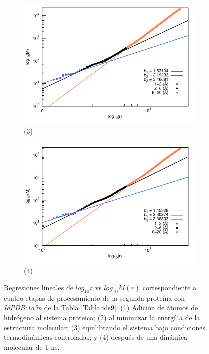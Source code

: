 \begin{figure}[H]
	\vspace{0cm} %
	
	\hspace{-0.3cm} 
	\begin{subfigure}{0.49\textwidth}
		\centering
		\includegraphics[width=\linewidth,page=1]{graphs/PDBs/1a3n/1a3nEq.pdf}
		\caption{(3)}
	\end{subfigure}
	\hspace{0.2cm}
	\begin{subfigure}{0.49\textwidth} %
		\centering
		\includegraphics[width=\linewidth,page=1]{graphs/PDBs/1a3n/1a3n1ns.pdf}
		\caption{(4)}
	\end{subfigure}
	\caption{Regresiones lineales de $log_{10}r$ vs $log_{10}M(r)$ correspondiente a cuatro etapas de procesamiento de la segunda prote\'{i}na con \textit{IdPDB:1a3n} de la Tabla \ref{Tabla:ids9}: (1) Adici\'{o}n de \'{a}tomos de hidr\'{o}geno al sistema proteico; (2) al minimizar la energ\'{i´}a de la estructura molecular; (3) equilibrando el sistema bajo condiciones termodin\'{a}micas controladas; y (4) despu\'{e}s de una din\'{a}mica molecular de 1 ns.}
	\label{fig:1a3n}
\end{figure}

